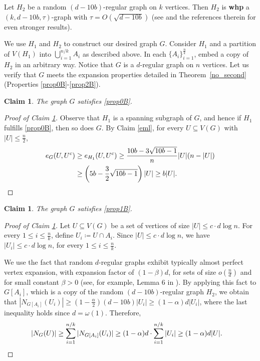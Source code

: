 \documentclass[notitlepage]{scrartcl}
\newtheorem{claim}[thm]{Claim}
\begin{document}
Let $H_2$ be a random $(d-10b)$-regular graph on $k$ vertices. Then $H_2$ is \textbf{whp} a $(k,d-10b,\tau)$-graph with $\tau=O\left(\sqrt{d-10b}\right)$ (see
\cite{zbMATH05037081,zbMATH07751065,zbMATH07036340} and the references therein for even stronger results).

We use $H_1$ and $H_2$ to construct our desired graph $G$. Consider $H_1$ and a partition of $V(H_1)$ into $\bigcup_{i=1}^{n/k}A_i$ as described above. In each $\{A_i\}_{i=1}^{\frac{n}{k}}$, embed a copy of $H_2$ in an arbitrary way. Notice that $G$ is a $d$-regular graph on $n$ vertices. Let us verify that $G$ meets the expansion properties detailed in Theorem~\ref{no_second} (Properties \ref{prop0B}-\ref{prop2B}).

\begin{claim}\label{first}
    The graph $G$ satisfies \ref{prop0B}.
\end{claim}

\begin{proof}[Proof of Claim \ref{first}]
    Observe that $H_1$ is a spanning subgraph of $G$, and hence if $H_1$ fulfills \ref{prop0B}, then so does $G$. By Claim \ref{eml}, for every $U\subseteq V(G)$ with $|U|\le \frac{n}{2}$, 
    \begin{align*}
        e_G(U,U^c)&\ge e_{H_1}(U,U^c)\ge \frac{10 b-3\sqrt{10 b-1}}{n}|U|(n-|U|)\\
        &\ge \left(5 b-\frac{3}{2}\sqrt{10 b-1}\right)|U|\ge b|U|.\qedhere
    \end{align*}
\end{proof}

\begin{claim} \label{second}
    The graph $G$ satisfies \ref{prop1B}.
\end{claim}

\begin{proof}[Proof of Claim \ref{second}]
    Let $U\subseteq V(G)$ be a set of vertices of size $|U|\le c\cdot d\log n$. For every $1\le i\le \frac{n}{k}$, define $U_i\coloneqq U\cap A_i$.
    Since $|U|\le c\cdot d\log n$, we have $|U_i|\le c\cdot d\log n$, for every $1\le i\le \frac{n}{k}$. 
    
    We use the fact that random $d$-regular graphs exhibit typically almost perfect vertex expansion, with expansion factor of $(1-\beta)d$, for sets of size $o\left(\frac{n}{d}\right)$ and for small constant $\beta>0$ (see, for example, Lemma 6 in \cite{zbMATH06305468}).
    By applying this fact to $G[A_i]$, which is a copy of the random $(d-10b)$-regular graph $H_2$, we obtain that $|N_{G[A_i]}(U_i)|\ge \left(1-\frac{\alpha}{2}\right)(d-10b)|U_i|\ge (1-\alpha)d|U_i|$, where the last inequality holds since $d=\omega(1)$.
    Therefore, 
    \begin{align*}
        |N_G(U)|\ge \sum_{i=1}^{n/k} |N_{G[A_i]}(U_i)|\ge (1-\alpha)d\cdot \sum_{i=1}^{n/k} |U_i| \ge (1-\alpha)d|U|.&\qedhere
    \end{align*} 
\end{proof}
\end{document}
